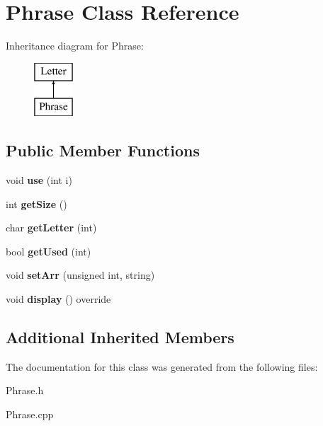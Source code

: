 \hypertarget{class_phrase}{}\section{Phrase Class Reference}
\label{class_phrase}
Inheritance diagram for Phrase\+:\begin{figure}[H]
\begin{center}
\leavevmode
\includegraphics[height=2.000000cm]{class_phrase}
\end{center}
\end{figure}
\subsection*{Public Member Functions}
\begin{DoxyCompactItemize}
\item 
\hypertarget{class_phrase_aad8eb600a46aa1ffc25d7e0cb832f39b}{}\label{class_phrase_aad8eb600a46aa1ffc25d7e0cb832f39b} 
void {\bfseries use} (int i)
\item 
\hypertarget{class_phrase_a8144c049dc65c586127262d367545c20}{}\label{class_phrase_a8144c049dc65c586127262d367545c20} 
int {\bfseries get\+Size} ()
\item 
\hypertarget{class_phrase_a37e468274bd22c24e4cd1b76da578a72}{}\label{class_phrase_a37e468274bd22c24e4cd1b76da578a72} 
char {\bfseries get\+Letter} (int)
\item 
\hypertarget{class_phrase_a6144cc3eeb1f836b17e3d5f27d8eeec4}{}\label{class_phrase_a6144cc3eeb1f836b17e3d5f27d8eeec4} 
bool {\bfseries get\+Used} (int)
\item 
\hypertarget{class_phrase_ac673baf27de8946062e8f7846d2eb35c}{}\label{class_phrase_ac673baf27de8946062e8f7846d2eb35c} 
void {\bfseries set\+Arr} (unsigned int, string)
\item 
\hypertarget{class_phrase_a5913994bf6d88d27010ea27c7ed5a9ff}{}\label{class_phrase_a5913994bf6d88d27010ea27c7ed5a9ff} 
void {\bfseries display} () override
\end{DoxyCompactItemize}
\subsection*{Additional Inherited Members}


The documentation for this class was generated from the following files\+:\begin{DoxyCompactItemize}
\item 
Phrase.\+h\item 
Phrase.\+cpp\end{DoxyCompactItemize}

